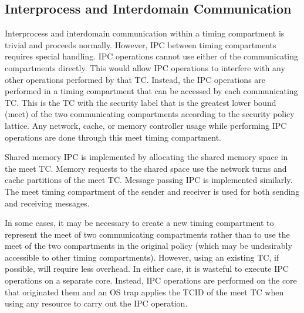 
\subsection{Interprocess and Interdomain Communication}
Interprocess and interdomain communication within a timing compartment is 
trivial and proceeds normally. However, IPC between timing 
compartments requires special handling. IPC operations cannot use
either of the communicating compartments directly. This would allow IPC 
operations to interfere with any other operations performed by that TC.
Instead, the IPC operations are performed in a timing compartment that can be 
accessed by each communicating TC. This is 
the TC with the security label that is the greatest lower bound (meet) of the 
two communicating compartments according to the security policy lattice.  
Any network, cache, or memory controller usage while performing IPC operations
are done through this meet timing compartment.

Shared memory IPC is implemented by allocating the shared memory space in the 
meet TC. Memory requests to the shared space use the network turns and cache 
partitions of the meet TC. Message passing IPC is implemented similarly.
The meet timing compartment of the sender and receiver is used for both sending
and receiving messages.

In some cases, it may be necessary to create a new timing compartment to
represent the meet of two communicating compartments rather than to use
the meet of the two compartments in the original policy (which may be
undesirably accessible to other timing compartments). However, using an 
existing TC, if possible, will require less overhead.
In either case, it is wasteful to execute IPC operations on a separate core. 
Instead, IPC operations are performed on the core that originated them and an OS 
trap applies the TCID of the meet TC when using any resource to carry out the 
IPC operation.


